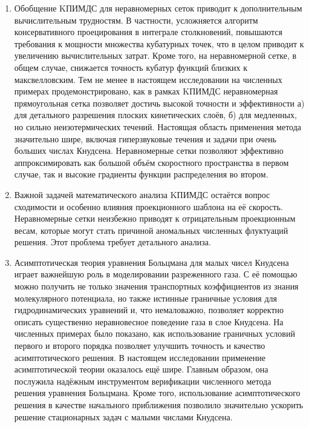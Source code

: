 \begin{enumerate}[wide]

\item Обобщение KПИМДС для неравномерных сеток приводит к дополнительным вычислительным трудностям.
В частности, усложняется алгоритм консервативного проецирования в интеграле столкновений,
повышаются требования к мощности множества кубатурных точек,
что в целом приводит к увеличению вычислительных затрат.
Кроме того, на неравномерной сетке, в общем случае, снижается точность кубатур функций близких к максвелловским.
Тем не менее в настоящем исследовании на численных примерах продемонстрировано,
как в рамках KПИМДС неравномерная прямоугольная сетка позволяет достичь высокой точности и эффективности
а) для детального разрешения плоских кинетических слоёв,
б) для медленных, но сильно неизотермических течений.
Настоящая область применения метода значительно шире, включая
гиперзвуковые течения и задачи при очень больших числах Кнудсена.
Неравномерные сетки позволяют эффективно аппроксимировать
как большой объём скоростного пространства в первом случае,
так и высокие градиенты функции распределения во втором.

\item Важной задачей математического анализа KПИМДС остаётся вопрос сходимости
и особенно влияния проекционного шаблона на её скорость.
Неравномерные сетки неизбежно приводят к отрицательным проекционным весам,
которые могут стать причиной аномальных численных флуктуаций решения.
Этот проблема требует детального анализа.

\item Асимптотическая теория уравнения Больцмана для малых чисел Кнудсена
играет важнейшую роль в моделировании разреженного газа.
С её помощью можно получить не только значения транспортных коэффициентов из знания молекулярного потенциала,
но также истинные граничные условия для гидродинамических уравнений и, что немаловажно,
позволяет корректно описать существенно неравновесное поведение газа в слое Кнудсена.
На численных примерах было показано, как использование граничных условий первого и второго порядка
позволяет улучшить точность и качество асимптотического решения.
В настоящем исследовании применение асимптотической теории оказалось ещё шире.
Главным образом, она послужила надёжным инструментом верификации численного метода решения уравнения Больцмана.
Кроме того, использование асимптотического решения в качестве начального приближения позволило
значительно ускорить решение стационарных задач с малыми числами Кнудсена.


\end{enumerate}
